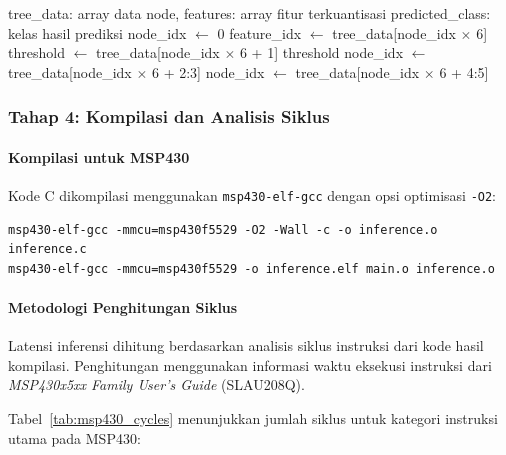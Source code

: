 \begin{algorithm}[htbp]
\caption{Traversal Pohon Keputusan Terkuantisasi}
\label{alg:tree_predict}
\begin{algorithmic}[1]
\REQUIRE tree\_data: array data node, features: array fitur terkuantisasi
\ENSURE predicted\_class: kelas hasil prediksi
\STATE node\_idx $\leftarrow$ 0
    \STATE feature\_idx $\leftarrow$ tree\_data[node\_idx $\times$ 6]
    \STATE threshold $\leftarrow$ tree\_data[node\_idx $\times$ 6 + 1]
        \RETURN threshold 
    \ENDIF
        \STATE node\_idx $\leftarrow$ tree\_data[node\_idx $\times$ 6 + 2:3] 
    \ELSE
        \STATE node\_idx $\leftarrow$ tree\_data[node\_idx $\times$ 6 + 4:5] 
    \ENDIF
\ENDWHILE
\end{algorithmic}
\end{algorithm}

\subsubsection{Tahap 4: Kompilasi dan Analisis Siklus}

\paragraph{Kompilasi untuk MSP430}
Kode C dikompilasi menggunakan \texttt{msp430-elf-gcc} dengan opsi optimisasi \texttt{-O2}:

\begin{verbatim}
msp430-elf-gcc -mmcu=msp430f5529 -O2 -Wall -c -o inference.o inference.c
msp430-elf-gcc -mmcu=msp430f5529 -o inference.elf main.o inference.o
\end{verbatim}

\paragraph{Metodologi Penghitungan Siklus}
Latensi inferensi dihitung berdasarkan analisis siklus instruksi dari kode hasil kompilasi. Penghitungan menggunakan informasi waktu eksekusi instruksi dari \textit{MSP430x5xx Family User's Guide} (SLAU208Q).

Tabel~\ref{tab:msp430_cycles} menunjukkan jumlah siklus untuk kategori instruksi utama pada MSP430:

